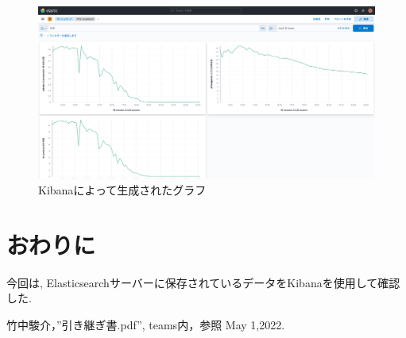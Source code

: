 \documentclass[a4j,12pt,]{jarticle}
\begin{document}
\begin{figure}[H]
  \begin{center}
    \includegraphics[width=160mm]{graph.png}
    \caption{Kibanaによって生成されたグラフ}
    \label{p3}
  \end{center}
\end{figure}

\section{おわりに}
今回は, Elasticsearchサーバーに保存されているデータをKibanaを使用して確認した.

\begin{thebibliography}{5}
  竹中駿介，”引き継ぎ書.pdf”, teams内，参照 May 1,2022.
\end{thebibliography}
\end{document}
